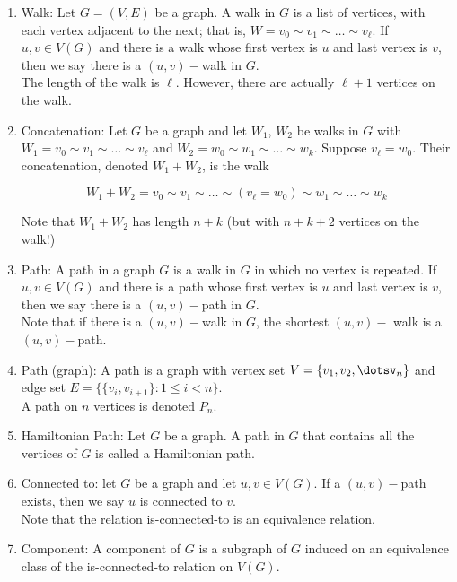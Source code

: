 \documentclass{article}
\begin{document}
\begin{enumerate}
    \item Walk: Let $G=(V,E)$ be a graph. A walk in $G$ is a list of vertices, with each vertex adjacent to the next; that is, $W=v_0\sim v_1\sim\dots\sim v_\ell$. If $u,v\in V(G)$ and there is a walk whose first vertex is $u$ and last vertex is $v$, then we say there is a $(u,v)-$walk in $G$.\\
    
    The length of the walk is $\ell$. However, there are actually $\ell +1$ vertices on the walk.
    
    \item Concatenation: Let $G$ be a graph and let $W_1$, $W_2$ be walks in $G$ with $W_1=v_0\sim v_1\sim \dots\sim v_\ell$ and $W_2=w_0\sim w_1\sim \dots\sim w_k$. Suppose $v_\ell=w_0$. Their concatenation, denoted $W_1+W_2$, is the walk
    
    \[W_1+W_2=v_0\sim v_1\sim\dots\sim(v_\ell=w_0)\sim w_1\sim\dots\sim w_k\]
    
    Note that $W_1+W_2$ has length $n+k$ (but with $n+k+2$ vertices on the walk!)
    
    \item Path: A path in a graph $G$ is a walk in $G$ in which no vertex is repeated. If $u,v\in V(G)$ and there is a path whose first vertex is $u$ and last vertex is $v$, then we say there is a $(u,v)-$path in $G$. \\
    
    Note that if there is a $(u,v)-$walk in $G$, the shortest $(u,v)-$ walk is a $(u,v)-$path.
    
    \item Path (graph): A path is a graph with vertex set $V=\{v_1,v_2,\dotsv_n\}$ and edge set $E=\{\{v_i,v_{i+1}\}:1\leq i<n\}$.\\
    
    A path on $n$ vertices is denoted $P_n$.
    
    \item Hamiltonian Path: Let $G$ be a graph. A path in $G$ that contains all the vertices of $G$ is called a Hamiltonian path.
    
    \item Connected to: let $G$ be a graph and let $u,v\in V(G)$. If a $(u,v)-$path exists, then we say $u$ is connected to $v$.\\
    
    Note that the relation is-connected-to is an equivalence relation.
    
    \item Component: A component of $G$ is a subgraph of $G$ induced on an equivalence class of the is-connected-to relation on $V(G)$.
    

\end{enumerate}
\end{document}
